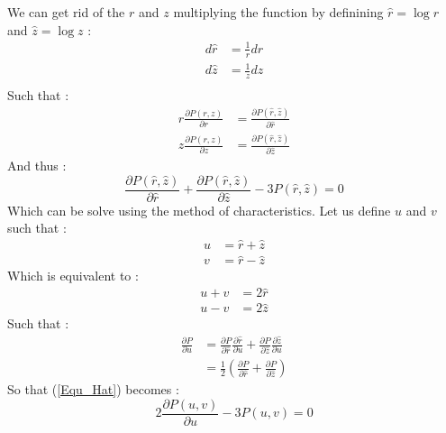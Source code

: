 \documentclass[a4paper,12pt]{article}
\theoremstyle{definition}
\begin{document}
We can get rid of the $r$ and $z$ multiplying the function by definining $\hat{r}=\log{r}$ and $\hat{z}=\log{z}$ :
\begin{equation}
\begin{split}
	d\hat{r}&=\frac{1}{r}dr\\
	d\hat{z}&=\frac{1}{z}dz\\
\end{split}
\end{equation}
Such that :
\begin{equation}
\begin{split}
	r\frac{\partial P(r,z)}{\partial r}&=\frac{\partial P(\hat r,\hat z)}{\partial \hat{r}}\\
	z\frac{\partial P(r,z)}{\partial z}&=\frac{\partial P(\hat r,\hat z)}{\partial \hat{z}}
\end{split}
\end{equation}
And thus :
\begin{equation}\label{Equ_Hat}
	\frac{\partial P(\hat r,\hat z)}{\partial \hat{r}}+\frac{\partial P(\hat r,\hat z)}{\partial \hat{z}}-3P(\hat r,\hat z)=0
\end{equation}
Which can be solve using the method of characteristics.
Let us define $u$ and $v$ such that :
\begin{equation}
\begin{split}
	u&=\hat r + \hat z\\
	v&=\hat r - \hat z
\end{split}
\end{equation}
Which is equivalent to :
\begin{equation}
\begin{split}
	u+v&=2\hat r\\
	u-v&=2\hat z
\end{split}
\end{equation}
Such that :
\begin{equation}
\begin{split}
	\frac{\partial P}{\partial u}&=\frac{\partial P}{\partial \hat{r}}\frac{\partial \hat r}{\partial u}+\frac{\partial P}{\partial \hat{z}}\frac{\partial \hat z}{\partial u}\\
	&=\frac{1}{2}(\frac{\partial P}{\partial \hat{r}}+\frac{\partial P}{\partial \hat{z}})
\end{split}
\end{equation}
So that (\ref{Equ_Hat}) becomes :
\begin{equation}
	2\frac{\partial P(u,v)}{\partial u}-3P(u,v)=0
\end{equation}
\end{document}
